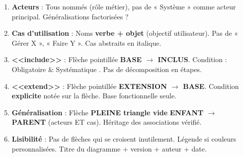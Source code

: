 \documentclass[11pt]{article}
\begin{document}
\begin{aretenir}
\begin{enumerate}
    \item \textbf{Acteurs} : Tous nommés (rôle métier), pas de « Système » comme acteur principal. Généralisations factorisées ?
    \item \textbf{Cas d'utilisation} : Noms \textbf{verbe + objet} (objectif utilisateur). Pas de « Gérer X », « Faire Y ». Cas abstraits en italique.
    \item \textbf{<<include>>} : Flèche pointillée \textbf{BASE $\rightarrow$ INCLUS}. Condition : \guillemotleft Obligatoire \& Systématique \guillemotright. Pas de décomposition en étapes.
    \item \textbf{<<extend>>} : Flèche pointillée \textbf{EXTENSION $\rightarrow$ BASE}. Condition \textbf{explicite} notée sur la flèche. Base fonctionnelle seule.
    \item \textbf{Généralisation} : Flèche \textbf{PLEINE triangle vide} \textbf{ENFANT $\rightarrow$ PARENT} (acteurs ET cas). Héritage des associations vérifié.
    \item \textbf{Lisibilité} : Pas de flèches qui se croisent inutilement. Légende si couleurs personnalisées. Titre du diagramme + version + auteur + date.
\end{enumerate}
\end{aretenir}
\end{document}
